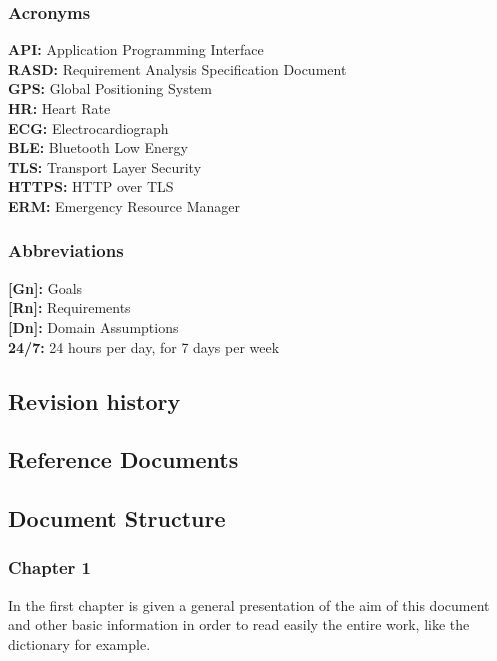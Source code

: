 \begin{flushleft}
\paragraph{}
{\color{Blue}\subsubsection{Acronyms}}
\textbf{API:} Application Programming Interface\\
\textbf{RASD:} Requirement Analysis Specification Document \\
\textbf{GPS:}  Global Positioning System\\
\textbf{HR:}  Heart Rate\\
\textbf{ECG:} Electrocardiograph\\
\textbf{BLE:} Bluetooth Low Energy\\
\textbf{TLS:} Transport Layer Security\\
\textbf{HTTPS:} HTTP over TLS\\
\textbf{ERM:} Emergency Resource Manager
\paragraph{}
{\color{Blue}\subsubsection{Abbreviations}}
\textbf{[Gn]:} Goals\\
\textbf{[Rn]:} Requirements\\
\textbf{[Dn]:} Domain Assumptions\\
\textbf{24/7:} 24 hours per day, for 7 days per week \\
\paragraph{}

{\color{Blue}\subsection{Revision history}}


{\color{Blue}\subsection{Reference Documents}}
 
{\color{Blue}\subsection{Document Structure}}
{\color{Blue}\subsubsection{Chapter 1}}
In the first chapter is given a general presentation of the aim of this document and other basic information in order to read easily the entire work, like the dictionary for example.\par

\end{flushleft}
